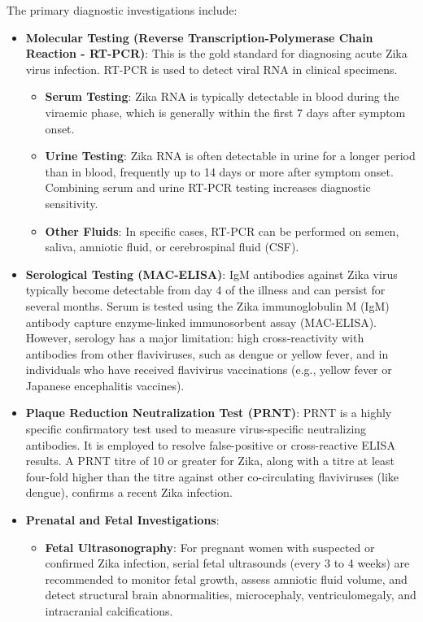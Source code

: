 The primary diagnostic investigations include:
\begin{itemize}
    \item \textbf{Molecular Testing (Reverse Transcription-Polymerase Chain Reaction - RT-PCR)}: This is the gold standard for diagnosing acute Zika virus infection. RT-PCR is used to detect viral RNA in clinical specimens.
    \begin{itemize}
        \item \textbf{Serum Testing}: Zika RNA is typically detectable in blood during the viraemic phase, which is generally within the first 7 days after symptom onset.
        \item \textbf{Urine Testing}: Zika RNA is often detectable in urine for a longer period than in blood, frequently up to 14 days or more after symptom onset. Combining serum and urine RT-PCR testing increases diagnostic sensitivity.
        \item \textbf{Other Fluids}: In specific cases, RT-PCR can be performed on semen, saliva, amniotic fluid, or cerebrospinal fluid (CSF).
    \end{itemize}
    \item \textbf{Serological Testing (MAC-ELISA)}: IgM antibodies against Zika virus typically become detectable from day 4 of the illness and can persist for several months. Serum is tested using the Zika immunoglobulin M (IgM) antibody capture enzyme-linked immunosorbent assay (MAC-ELISA). However, serology has a major limitation: high cross-reactivity with antibodies from other flaviviruses, such as dengue or yellow fever, and in individuals who have received flavivirus vaccinations (e.g., yellow fever or Japanese encephalitis vaccines).
    \item \textbf{Plaque Reduction Neutralization Test (PRNT)}: PRNT is a highly specific confirmatory test used to measure virus-specific neutralizing antibodies. It is employed to resolve false-positive or cross-reactive ELISA results. A PRNT titre of 10 or greater for Zika, along with a titre at least four-fold higher than the titre against other co-circulating flaviviruses (like dengue), confirms a recent Zika infection.
    \item \textbf{Prenatal and Fetal Investigations}:
    \begin{itemize}
        \item \textbf{Fetal Ultrasonography}: For pregnant women with suspected or confirmed Zika infection, serial fetal ultrasounds (every 3 to 4 weeks) are recommended to monitor fetal growth, assess amniotic fluid volume, and detect structural brain abnormalities, microcephaly, ventriculomegaly, and intracranial calcifications.

\end{itemize}
\end{itemize}
